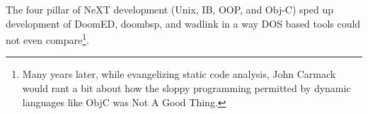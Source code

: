 The four pillar of NeXT development (Unix, IB, OOP, and Obj-C) sped up development of DoomED, doombsp, and wadlink in a way DOS based tools could not even compare\footnote{Many years later, while evangelizing static code analysis, John Carmack would rant a bit about how the sloppy programming permitted by dynamic languages like ObjC was Not A Good Thing.}.

